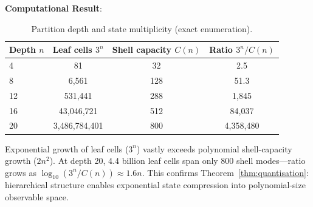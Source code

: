 \documentclass[11pt,twocolumn,a4paper]{article}
\theoremstyle{definition}
\begin{document}
\textbf{Computational Result}:

\begin{table}[H]
\centering\small
\caption{Partition depth and state multiplicity (exact enumeration).}
\begin{tabular}{lccc}
\toprule
Depth $n$ & Leaf cells $3^n$ & Shell capacity $C(n)$ & Ratio $3^n / C(n)$ \\
\midrule
4  & 81 & 32 & 2.5 \\
8  & 6,561 & 128 & 51.3 \\
12 & 531,441 & 288 & 1,845 \\
16 & 43,046,721 & 512 & 84,037 \\
20 & 3,486,784,401 & 800 & 4,358,480 \\
\bottomrule
\end{tabular}
\end{table}

Exponential growth of leaf cells ($3^n$) vastly exceeds polynomial shell-capacity growth ($2n^2$). At depth 20, 4.4 billion leaf cells span only 800 shell modes—ratio grows as $\log_{10}(3^n/C(n)) \approx 1.6n$. This confirms Theorem~\ref{thm:quantisation}: hierarchical structure enables exponential state compression into polynomial-size observable space.
\end{document}
